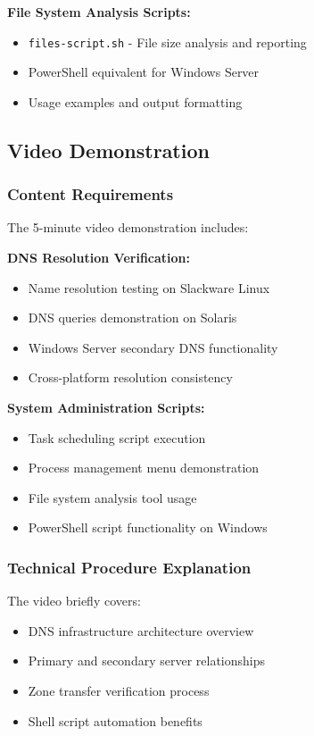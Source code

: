 \documentclass[12pt,a4paper]{article}
\begin{document}
\textbf{File System Analysis Scripts:}
\begin{itemize}
    \item \texttt{files-script.sh} - File size analysis and reporting
    \item PowerShell equivalent for Windows Server
    \item Usage examples and output formatting
\end{itemize}

\subsection{Video Demonstration}\label{subsec:video-demo}

\subsubsection{Content Requirements}
The 5-minute video demonstration includes:

\textbf{DNS Resolution Verification:}
\begin{itemize}
    \item Name resolution testing on Slackware Linux
    \item DNS queries demonstration on Solaris
    \item Windows Server secondary DNS functionality
    \item Cross-platform resolution consistency
\end{itemize}

\textbf{System Administration Scripts:}
\begin{itemize}
    \item Task scheduling script execution
    \item Process management menu demonstration
    \item File system analysis tool usage
    \item PowerShell script functionality on Windows
\end{itemize}

\subsubsection{Technical Procedure Explanation}
The video briefly covers:
\begin{itemize}
    \item DNS infrastructure architecture overview
    \item Primary and secondary server relationships
    \item Zone transfer verification process
    \item Shell script automation benefits
\end{itemize}
\end{document}
